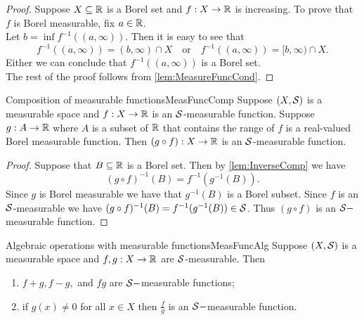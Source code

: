 \documentclass[twoside, openright, fontsize=10pt, headings=big]{scrbook}
\begin{document}
\begin{proof}
    Suppose $X \subseteq\mathbb{R}$ is a Borel set and $f : X \to\mathbb{R}$ is increasing. To prove that $f$ is Borel measurable, fix $a \in\mathbb{R}$.\\
    Let $b=\inf f^{-1}((a,\infty))$. Then it is easy to see that
    \[
        f^{-1}((a,\infty))=(b,\infty)\cap X\quad\text{or}\quad f^{-1}((a,\infty))=[b,\infty)\cap X.
    \] 
    Either we can conclude that $f^{-1}((a,\infty))$ is a Borel set.\\
    The rest of the proof follows from \ref{lem:MeasureFuncCond}.
\end{proof}
\begin{lemma}{Composition of measurable functions}{MeasFuncComp}
    Suppose $(X, \mathcal{S})$ is a measurable space and $f : X \to\mathbb{R}$ is an $\mathcal{S}$-measurable function. Suppose $g:A\to\mathbb{R}$ where $A$ is a subset of $\mathbb{R}$ that contains the range of $f$ is a real-valued Borel measurable function. Then $(g\circ f) : X \to\mathbb{R}$ is an $\mathcal{S}$-measurable function.
\end{lemma}
\begin{proof}
    Suppose that $B\subseteq \mathbb{R}$ is a Borel set. Then by \ref{lem:InverseComp} we have
    \[
        (g\circ f)^{-1}(B)=f^{-1}(g^{-1}(B)).
    \]
    Since $g$ is Borel measurable we have that $g^{-1}(B)$ is a Borel subset. Since $f$ is an $\mathcal{S}$-measurable we have $(g\circ f)^{-1}(B)=f^{-1}(g^{-1}(B))\in\mathcal{S}$. Thus $(g\circ f)$ is an $\mathcal{S}-$measurable function.
\end{proof}
\begin{theorem}{Algebraic operations with measurable functions}{MeasFuncAlg}
    Suppose $(X, \mathcal{S})$ is a measurable space and $f , g : X \to\mathbb{R}$ are $\mathcal{S}$-measurable. Then
    \begin{enumerate}[label=(\alph*)]
        \item $f+g,f-g,$ and $fg$ are $\mathcal{S}-$measurable functions;
        \item if $g(x)\neq0$ for all $x\in X$ then $\frac{f}{g}$ is an $\mathcal{S}-$measurable function.
    \end{enumerate}
\end{theorem}
\end{document}
